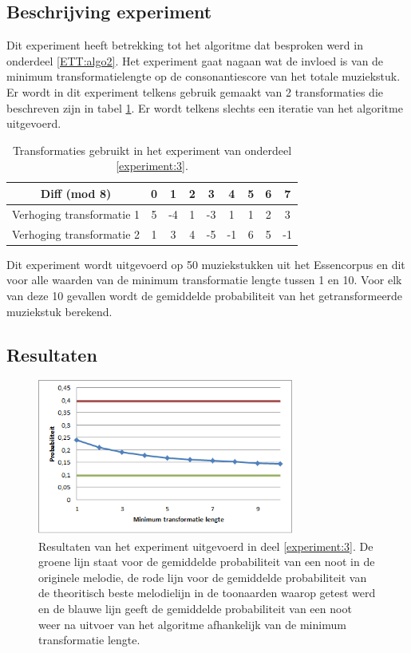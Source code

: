 \subsection{Beschrijving experiment}
Dit experiment heeft betrekking tot het algoritme dat besproken werd in onderdeel \ref{ETT:algo2}. Het experiment gaat nagaan wat de invloed is van de minimum transformatielengte op de consonantiescore van het totale muziekstuk. Er wordt in dit experiment telkens gebruik gemaakt van 2 transformaties die beschreven zijn in tabel \ref{tabel:exp3}. Er wordt telkens slechts een iteratie van het algoritme uitgevoerd.\\

\begin{table}
  \centering
  \begin{tabular}{c | c c c c c c c c }
    Diff (mod 8) & 0 & 1 & 2 & 3 & 4 & 5 & 6 & 7 \\
    \hline
    \hline
    Verhoging transformatie 1 & 5 & -4 & 1 & -3 & 1 & 1 & 2 & 3 \\
    \hline
    Verhoging transformatie 2 & 1 & 3 & 4 & -5 & -1 & 6 & 5 & -1 \\
  \end{tabular}
  \caption{Transformaties gebruikt in het experiment van onderdeel \ref{experiment:3}.}
  \label{tabel:exp3}
\end{table}

Dit experiment wordt uitgevoerd op 50 muziekstukken uit het Essencorpus en dit voor alle waarden van de minimum transformatie lengte tussen 1 en 10. Voor elk van deze 10 gevallen wordt de gemiddelde probabiliteit van het getransformeerde muziekstuk berekend.

\subsection{Resultaten}

\begin{figure}[!ht]
  \centering
  \includegraphics[width=0.75\textwidth]{5_Experimenten_Resultaten/exp3_res}
  \caption{Resultaten van het experiment uitgevoerd in deel \ref{experiment:3}. De groene lijn staat voor de gemiddelde probabiliteit van een noot in de originele melodie, de rode lijn voor de gemiddelde probabiliteit van de theoritisch beste melodielijn in de toonaarden waarop getest werd en de blauwe lijn geeft de gemiddelde probabiliteit van een noot weer na uitvoer van het algoritme afhankelijk van de minimum transformatie lengte.}
  \label{figuur:exp3}
\end{figure}

